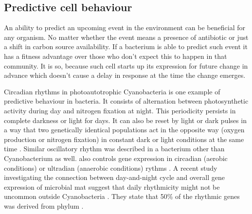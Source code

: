 
\subsection{Predictive cell behaviour}
An ability to predict an upcoming event in the environment can be beneficial for any organism.
No matter whether the event means a presence of antibiotic or just a shift in carbon source availability.
If a bacterium is able to predict such event it has a fitness advantage over those who don't expect this to happen in that community.
It is so, because such cell starts up its expression for future change in advance which doesn't cause a delay in response at the time the change emerges.

Circadian rhythms in photoautotrophic Cyanobacteria is one example of predictive behaviour in bacteria.
It consists of alternation between photosynthetic activity during day and nitrogen fixation at night.
This periodicity persists in complete darkness or light for days.
It can also be reset by light or dark pulses in a way that two genetically identical populations act in the opposite way (oxygen production or nitrogen fixation) in constant dark or light conditions at the same time \cite{kondo1993circadian}.
Similar oscillatory rhythm was described in a bacterium other than Cyanobacterium as well.
 also controls gene expression in circadian (aerobic conditions) or ultradian (anaerobic conditions) rythms \cite{min2005rhythmic}.
A recent study investigating the connection between day-and-night cycle and overall gene expression of microbial mat suggest that daily rhythmicity might not be uncommon outside Cyanobacteria \cite{hornlein2018daily}.
They state that 50\% of the rhythmic genes was derived from phylum .

